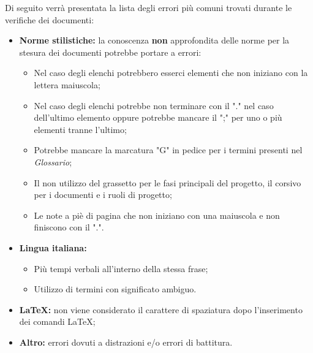 Di seguito verrà presentata la lista degli errori più comuni trovati durante le verifiche dei documenti:
\begin{itemize}
	\item \textbf{Norme stilistiche:} la conoscenza \textbf{non} approfondita delle norme per la stesura dei documenti potrebbe portare a errori:
		\begin{itemize}
			\item Nel caso degli elenchi potrebbero esserci elementi che non iniziano con la lettera maiuscola;
			\item Nel caso degli elenchi potrebbe non terminare con il "." nel caso dell'ultimo elemento oppure potrebbe mancare il ";" per uno o più elementi tranne l'ultimo; 
			\item Potrebbe mancare la marcatura "G" in pedice per i termini presenti nel \textit{Glossario};
			\item Il non utilizzo del grassetto per le fasi principali del progetto, il corsivo per i documenti e i ruoli di progetto;
			\item Le note a piè di pagina che non iniziano con una maiuscola e non finiscono con il ".".
		\end{itemize}
	\item \textbf{Lingua italiana:} 
		\begin{itemize}
			\item Più tempi verbali all'interno della stessa frase;
			\item Utilizzo di termini con significato ambiguo.
		\end{itemize}
	\item \textbf{\LaTeX:} non viene considerato il carattere di spaziatura dopo l'inserimento dei  comandi \LaTeX;
	\item \textbf{Altro:} errori dovuti a distrazioni e/o errori di battitura.
\end{itemize}